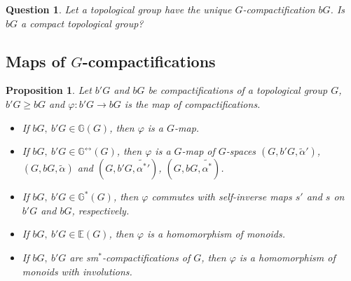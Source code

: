 \documentclass{amsart}
\newtheorem{pro}[thm]{Proposition}
\newtheorem{que}[thm]{Question}
\begin{document}
\begin{que}
Let a topological group have the unique $G$-compactification $b G$. Is $b G$ a compact topological group? 
\end{que}

\subsection{Maps of $G$-compactifications}

\begin{pro} 
Let $b' G$ and $b G$ be compactifications of a topological group $G$, $b' G\geq b G$ and $\varphi: b' G\to b G$ is the map of compactifications.
\begin{itemize}
\item[(a)] If $b G,\ b' G\in\mathbb{G}(G)$, then $\varphi$ is a $G$-map.
\item[(b)] If $b G,\ b' G\in\mathbb{G}^{\leftrightarrow}(G)$, then $\varphi$ is a $G$-map of $G$-spaces  $(G, b' G, \widetilde{\alpha}')$, $(G, b G, \widetilde{\alpha})$ and $(G, b' G, \widetilde{\alpha^*}')$, $(G, b G, \widetilde{\alpha^*})$.
\item[(c)]  If $b G,\ b' G\in\mathbb{G}^*(G)$, then $\varphi$  commutes with self-inverse maps $s'$ and $s$ on  $b' G$ and $b G$, respectively.
\item[(d)] If $b G,\ b' G\in\mathbb{E}(G)$, then $\varphi$ is a homomorphism of monoids.
\item[(e)]  If $b G,\ b' G$ are sm$^*$-compactifications of $G$, then $\varphi$ is a homomorphism of monoids with involutions. 
\end{itemize}
\end{pro}
\end{document}
